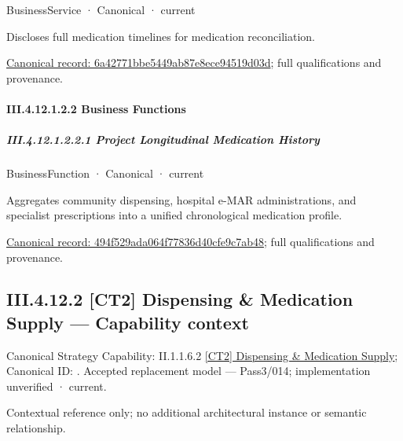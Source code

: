\label{element:6a42771bbe5449ab87e8ece94519d03d}
{\small BusinessService · Canonical · current}\par

Discloses full medication timelines for medication reconciliation.


{\footnotesize \href{../../../../../../../continuum/business/business-service/6a42771bbe5449ab87e8ece94519d03d.md}{Canonical record: 6a42771bbe5449ab87e8ece94519d03d}; full qualifications and provenance.}\par
\paragraph*{III.4.12.1.2.2 Business Functions}
\label{navigation:III.4.12.1.2.2}

\subparagraph*{III.4.12.1.2.2.1 Project Longitudinal Medication History}
\label{navigation:III.4.12.1.2.2.1}

\label{element:494f529ada064f77836d40cfe9c7ab48}
{\small BusinessFunction · Canonical · current}\par

Aggregates community dispensing, hospital e-MAR administrations, and specialist prescriptions into a unified chronological medication profile.


{\footnotesize \href{../../../../../../../continuum/business/business-function/494f529ada064f77836d40cfe9c7ab48.md}{Canonical record: 494f529ada064f77836d40cfe9c7ab48}; full qualifications and provenance.}\par
\subsection*{III.4.12.2 [CT2] Dispensing \& Medication Supply — Capability context}
\label{navigation:III.4.12.2}

{\small Canonical Strategy Capability: II.1.1.6.2 \hyperref[element:a85bdb32f6294d018e7d324cffd624d6]{[CT2] Dispensing \& Medication Supply}; Canonical ID: \texttt{}. Accepted replacement model — Pass3/014; implementation unverified · current.}\par
Contextual reference only; no additional architectural instance or semantic relationship.\par
